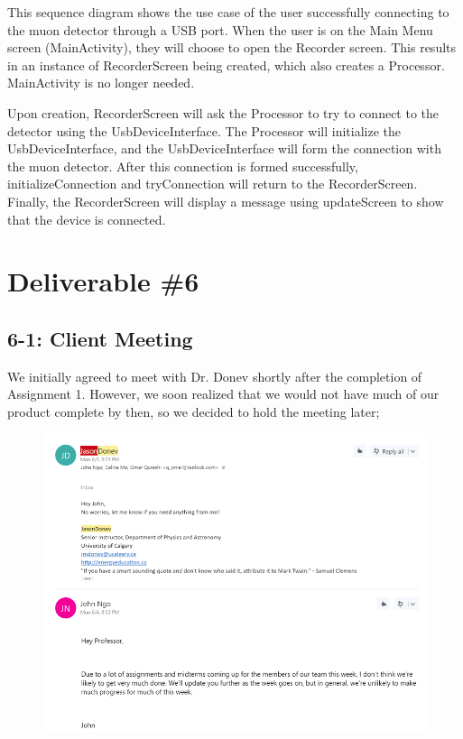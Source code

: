 \documentclass[11pt,a4paper]{article}
\begin{document}
This sequence diagram shows the use case of the user successfully connecting to the muon detector through a USB port. When the user is on the Main Menu screen (MainActivity), they will choose to open the Recorder screen. This results in an instance of RecorderScreen being created, which also creates a Processor. MainActivity is no longer needed. 

Upon creation, RecorderScreen will ask the Processor to try to connect to the detector using the UsbDeviceInterface. The Processor will initialize the UsbDeviceInterface, and the UsbDeviceInterface will form the connection with the muon detector. After this connection is formed successfully, initializeConnection and tryConnection will return to the RecorderScreen. Finally, the RecorderScreen will display a message using updateScreen to show that the device is connected.


\newpage

\section*{Deliverable \#6}

\subsection*{6-1: Client Meeting}

We initially agreed to meet with Dr. Donev shortly after the completion of Assignment 1. However, we soon realized that we would not have much of our product complete by then, so we decided to hold the meeting later;

\begin{figure}[h] \centering
	\includegraphics[width=1.1\textwidth]{email1.png}
\end{figure}
\end{document}
